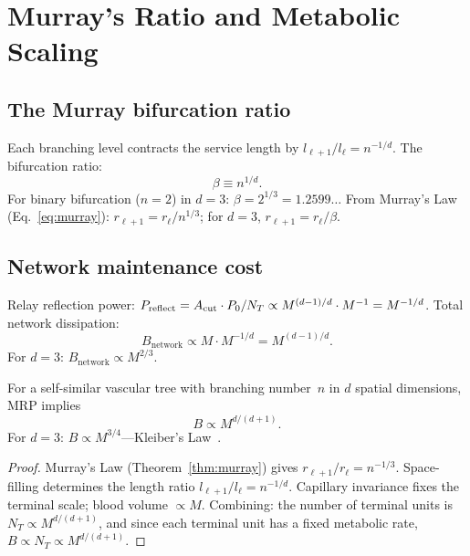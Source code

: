 \documentclass[aps,pre,twocolumn,superscriptaddress,floatfix]{revtex4-2}
\begin{document}
\section{Murray's Ratio and Metabolic Scaling}
\label{sec:murray-kleiber}

\subsection{The Murray bifurcation ratio}

Each branching level contracts the service length by
$l_{\ell+1}/l_\ell = n^{-1/d}$.
The bifurcation ratio:
\begin{equation}
  \boxed{\beta \equiv n^{1/d}.}
  \label{eq:beta-def}
\end{equation}
For binary bifurcation ($n=2$) in $d=3$:
$\beta = 2^{1/3} = 1.2599\ldots$
From Murray's Law (Eq.~\ref{eq:murray}):
$r_{\ell+1} = r_\ell/n^{1/3}$; for $d=3$,
$r_{\ell+1} = r_\ell/\beta$.

\subsection{Network maintenance cost}

Relay reflection power:
$P_{\text{reflect}} = A_{\text{cut}} \cdot P_0/N_T
\propto M^{(d-1)/d} \cdot M^{-1} = M^{-1/d}$.
Total network dissipation:
\begin{equation}
  B_{\text{network}} \propto M \cdot M^{-1/d}
  = M^{(d-1)/d}.
  \label{eq:B-network}
\end{equation}
For $d=3$: $B_{\text{network}} \propto M^{2/3}$.

\begin{theorem}
\label{thm:kleiber}
For a self-similar vascular tree with branching number~$n$
in $d$ spatial dimensions, MRP implies
\begin{equation}
  \boxed{B \propto M^{d/(d+1)}.}
  \label{eq:kleiber}
\end{equation}
For $d=3$: $B \propto M^{3/4}$---Kleiber's
Law~\cite{Kleiber1932}.
\end{theorem}

\begin{proof}
Murray's Law (Theorem~\ref{thm:murray}) gives
$r_{\ell+1}/r_\ell = n^{-1/3}$.
Space-filling determines the length ratio
$l_{\ell+1}/l_\ell = n^{-1/d}$.
Capillary invariance fixes the terminal scale;
blood volume $\propto M$.
Combining: the number of terminal units is
$N_T \propto M^{d/(d+1)}$, and since each terminal
unit has a fixed metabolic rate, $B \propto N_T
\propto M^{d/(d+1)}$.
\end{proof}
\end{document}
